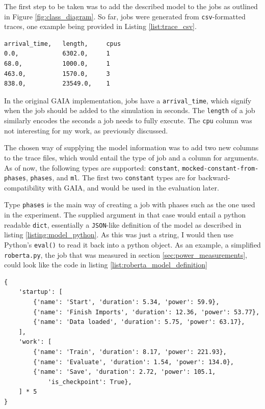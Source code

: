 The first step to be taken was to add the described model to the jobs as outlined in Figure \ref{fig:class_diagram}. 
So far, jobs were generated from \verb|csv|-formatted traces, one example being provided in Listing \ref{list:trace_csv}.

\begin{lstlisting}[frame=single, numbers=none, caption={Excerpt from the Alibaba-PAI trace}, label={list:trace_csv}, basicstyle=\ttfamily]
arrival_time,   length,     cpus
0.0,            6302.0,     1
68.0,           1000.0,     1
463.0,          1570.0,     3
838.0,          23549.0,    1
\end{lstlisting}

In the original GAIA implementation, jobs have a \verb|arrival_time|, which signify when the job should be added to the simulation in seconds. 
The \verb|length| of a job similarly encodes the seconds a job needs to fully execute. The \verb|cpu| column was not interesting for my work, as previously discussed.

The chosen way of supplying the model information was to add two new columns to the trace files, which would entail the type of job and a column for arguments. 
As of now, the following types are supported: \verb|constant|, \verb|mocked-constant-from-phases|, \verb|phases|, and \verb|ml|. 
The first two \verb|constant| types are for backward-compatibility with GAIA, and would be used in the evaluation later. 

Type \verb|phases| is the main way of creating a job with phases such as the one used in the experiment. The supplied argument in that case would entail a python readable \verb|dict|, essentially a \verb|JSON|-like definition of the model as described in listing \ref{listing:model_python}.
As this was just a string, I would then use Python's \verb|eval()| to read it back into a python object.
As an example, a simplified \verb|roberta.py|, the job that was measured in section \ref{sec:power_measurements}, could look like the code in listing \ref{list:roberta_model_definition}

\begin{lstlisting}[frame=single, numbers=none, caption={Simplified definition for a job similar to the experiment}, label={list:roberta_model_definition}, basicstyle=\ttfamily]
{
    'startup': [
        {'name': 'Start', 'duration': 5.34, 'power': 59.9},
        {'name': 'Finish Imports', 'duration': 12.36, 'power': 53.77},
        {'name': 'Data loaded', 'duration': 5.75, 'power': 63.17}, 
    ],
    'work': [
        {'name': 'Train', 'duration': 8.17, 'power': 221.93}, 
        {'name': 'Evaluate', 'duration': 1.54, 'power': 134.0}, 
        {'name': 'Save', 'duration': 2.72, 'power': 105.1,
            'is_checkpoint': True}, 
    ] * 5
}
\end{lstlisting}

